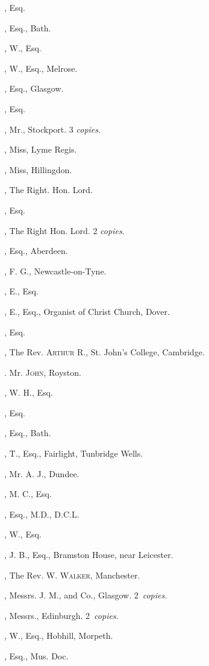\begin{multicols}{2}
, Esq.

, Esq., Bath.

, W., Esq.

, W., Esq., Melrose.

, Esq., Glasgow.

, Esq.

, Mr., Stockport. 3 \textit{copies}.

, Miss, Lyme Regis.

, Miss, Hillingdon.
\bigskip

, The Right. Hon. Lord.

, Esq.
\bigskip

, The Right Hon. Lord. 2 \textit{copies}.

, Esq., Aberdeen.

, F. G., Newcastle-on-Tyne.

, E., Esq.

, E., Esq., Organist of Christ
Church, Dover.

, Esq.

, The Rev. \textsc{Arthur} R., St. John’s
College, Cambridge.

. Mr. \textsc{John}, Royston.

, W. H., Esq.

, Esq.

, Esq., Bath.

, T., Esq., Fairlight, Tunbridge
Wells.

, Mr. A. J., Dundee.

, M. C., Esq.

, Esq., M.D., D.C.L.

, W., Esq.

, J. B., Esq., Bramston House,
near Leicester.

, The Rev. W. \textsc{Walker}, Manchester.

, Messrs. J. M., and Co., Glasgow.
2~\textit{copies}.

, Messrs., Edinburgh. 2~\textit{copies}.

, W., Esq., Hobhill, Morpeth.

, Esq., Mus. Doc.
\end{multicols}
\pagebreak
\setlength{\columnseprule}{0pt}


